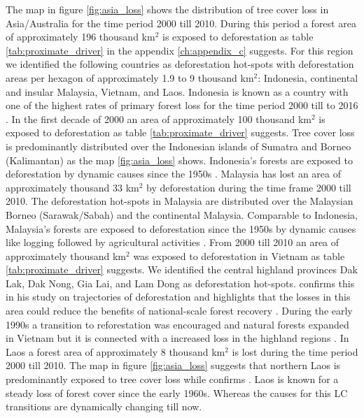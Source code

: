 			The map in figure \ref{fig:asia_loss} shows the distribution of tree cover loss in Asia/Australia for the time period 2000 till 2010. During this period a forest area of approximately 196 thousand km$^2$ is exposed to deforestation as table \ref{tab:proximate_driver} in the appendix \ref{ch:appendix_c} suggests. For this region we identified the following countries as deforestation hot-spots with deforestation areas per hexagon of approximately 1.9 to 9 thousand km$^2$: Indonesia, continental and insular Malaysia, Vietnam, and Laos. Indonesia is known as a country with one of the highest rates of primary forest loss for the time period 2000 till to 2016 \citep{Austin2019}. In the first decade of 2000 an area of approximately 100 thousand km$^2$ is exposed to deforestation as table \ref{tab:proximate_driver} suggests. Tree cover loss is predominantly distributed over the Indonesian islands of Sumatra and Borneo (Kalimantan) as the map \ref{fig:asia_loss} shows. Indonesia's forests are exposed to deforestation by dynamic causes since the 1950s \citep{Nawir2007}. Malaysia has lost an area of approximately thousand 33 km$^2$ by deforestation during the time frame 2000 till 2010. The deforestation hot-spots in Malaysia are distributed over the Malaysian Borneo (Sarawak/Sabah) and the continental Malaysia. Comparable to Indonesia, Malaysia's forests are exposed to deforestation since the 1950s by dynamic causes like logging followed by agricultural activities \citep{Kummer1994}. From 2000 till 2010 an area of approximately thousand km$^2$ was exposed to deforestation in Vietnam as table \ref{tab:proximate_driver} suggests. We identified the central highland provinces Dak Lak, Dak Nong, Gia Lai, and Lam Dong as deforestation hot-spots. \citeauthor{Meyfroidt2013} confirms this in his study on trajectories of deforestation and highlights that the losses in this area could reduce the benefits of national-scale forest recovery \citep{Meyfroidt2013}. During the early 1990s a transition to reforestation was encouraged and natural forests expanded in Vietnam but it is connected with a increased loss in the highland regions \citep{Meyfroidt2013,Chazdon2008}. In Laos a forest area of approximately 8 thousand km$^2$ is lost during the time period 2000 till 2010. The map in figure \ref{fig:asia_loss} suggests that northern Laos is predominantly exposed to tree cover loss while \citeauthor{Hirsch2000} confirms \citep{Hirsch2000}. Laos is known for a steady loss of forest cover since the early 1960s. Whereas the causes for this \ac{LC} transitions are dynamically changing till now.
